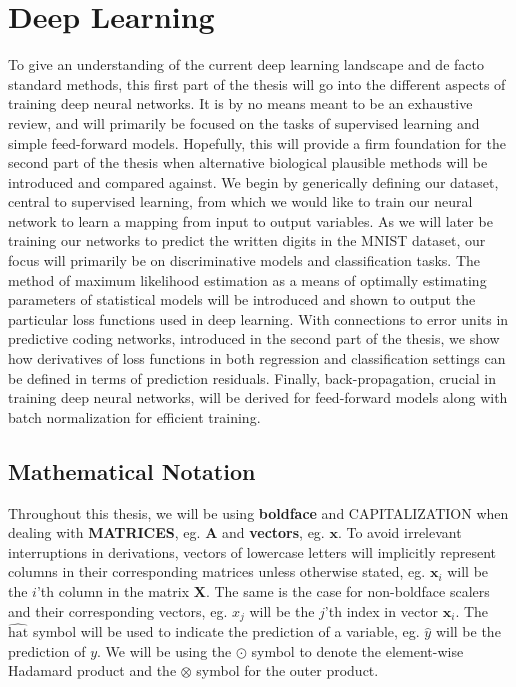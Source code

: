 \documentclass[a4paper,11pt]{article}
\begin{document}
\newpage

\section{Deep Learning}
To give an understanding of the current deep learning landscape and de facto standard methods, this first part of the thesis will go into the different aspects of training deep neural networks. It is by no means meant to be an exhaustive review, and will primarily be focused on the tasks of supervised learning and simple feed-forward models. Hopefully, this will provide a firm foundation for the second part of the thesis when alternative biological plausible methods will be introduced and compared against. We begin by generically defining our dataset, central to supervised learning, from which we would like to train our neural network to learn a mapping from input to output variables. As we will later be training our networks to predict the written digits in the MNIST dataset, our focus will primarily be on discriminative models and classification tasks. The method of maximum likelihood estimation as a means of optimally estimating parameters of statistical models will be introduced and shown to output the particular loss functions used in deep learning. With connections to error units in predictive coding networks, introduced in the second part of the thesis, we show how derivatives of loss functions in both regression and classification settings can be defined in terms of prediction residuals. Finally, back-propagation, crucial in training deep neural networks, will be derived for feed-forward models along with batch normalization for efficient training.


\subsection{Mathematical Notation}
Throughout this thesis, we will be using \textbf{boldface} and CAPITALIZATION when dealing with \textbf{MATRICES}, eg. $\mathbf{A}$ and \textbf{vectors}, eg. $\mathbf{x}$. To avoid irrelevant interruptions in derivations, vectors of lowercase letters will implicitly represent columns in their corresponding matrices unless otherwise stated, eg. $\mathbf{x}_i$ will be the $i$'th column in the matrix $\mathbf{X}$. The same is the case for non-boldface scalers and their corresponding vectors, eg. $x_j$ will be the $j$'th index in vector $\mathbf{x}_i$. The $\hat{\text{hat}}$ symbol will be used to indicate the prediction of a variable, eg. $\hat{y}$ will be the prediction of $y$. We will be using the $\odot$ symbol to denote the element-wise Hadamard product and the $\otimes$ symbol for the outer product. 
\end{document}
